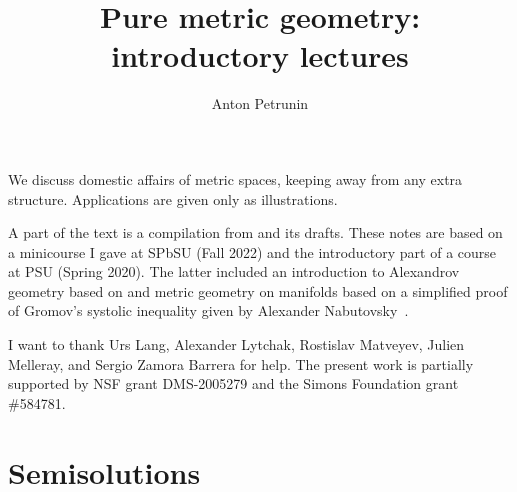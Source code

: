 \documentclass[twoside]{book}
\begin{document}

 
\title{Pure metric geometry:\\
introductory lectures}
\author{Anton Petrunin}
\date{}
\maketitle

We discuss domestic affairs of metric spaces,
keeping away from any extra structure. 
Applications are given only as illustrations.

A part of the text is a compilation from \cite{alexander-kapovitch-petrunin-2019, alexander-kapovitch-petrunin-2025, petrunin-yashinski, petrunin-2022-PIGTIKAL, petrunin-zamorabarrera} and its drafts.
These notes are based on a minicourse I gave at SPbSU (Fall 2022) and the introductory part of a course at PSU (Spring 2020).
The latter included an introduction to Alexandrov geometry based on \cite{alexander-kapovitch-petrunin-2019} and metric geometry on manifolds \cite{petrunin2020mnfld} based on a simplified proof of Gromov's systolic inequality given by Alexander Nabutovsky~\cite{nabutovsky}.

I want to thank
Urs Lang,
Alexander Lytchak,
Rostislav Matveyev,
Julien Melleray,
and Sergio Zamora Barrera for help.
The present work is partially supported by NSF grant DMS-2005279
and the Simons Foundation grant \#584781.

\thispagestyle{empty}
\tableofcontents
\thispagestyle{empty}






%

\appendix
\chapter{Semisolutions}






{\small\sloppy


\def\emph{\textit}

\printbibliography[heading=bibintoc]
\fussy
}
\end{document}

